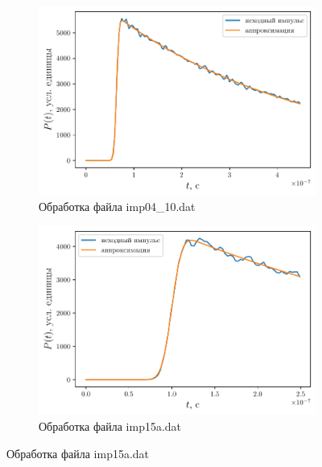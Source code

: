\begin{figure}[ht]
\begin{subfigure}{0.5\linewidth}
        \includegraphics[width=\linewidth]{fig/retracking/imp04_10_3}
        \caption{Обработка файла imp04\_10.dat}
        \label{fig:}
    \end{subfigure}
    \begin{subfigure}{0.5\linewidth}
        \centering
        \includegraphics[width=\linewidth]{fig/retracking/imp_15a_3}
        \caption{Обработка файла imp15a.dat}
        \label{fig:}
    \end{subfigure}
\end{figure}










